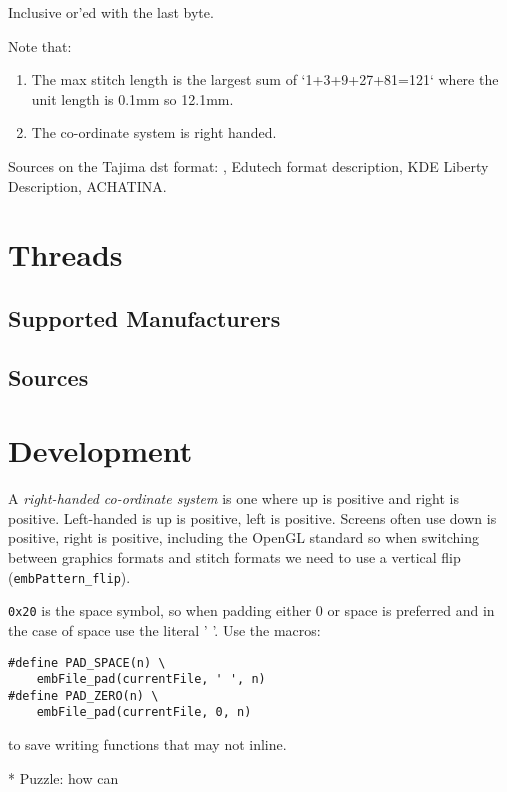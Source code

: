 \documentclass[onesize, a4paper]{refart}
\begin{document}
Inclusive or'ed with the last byte.

Note that:

\begin{enumerate}
\item The max stitch length is the largest sum of `1+3+9+27+81=121` where the unit length is 0.1mm so 12.1mm.
\item The co-ordinate system is right handed.
\end{enumerate}

Sources on the Tajima dst format: \cite{fineEmbStudio2021},
Edutech format description\cite{eduTechWikiDST},
KDE Liberty Description\cite{libertyTajima}, ACHATINA\cite{achatina}.

\section{Threads}

\subsection{Supported Manufacturers}

\subsection{Sources}

\section{Development}

A \emph{right-handed co-ordinate system} is one where up is positive and right is positive. Left-handed is up is positive, left is positive. Screens often use down is positive, right is positive, including the OpenGL standard so when switching between graphics formats and stitch formats we need to use a vertical flip (\texttt{embPattern\_flip}).

\texttt{0x20} is the space symbol, so when padding either 0 or space is preferred and in the case of space use the literal ' '. Use the macros:

\begin{verbatim}
#define PAD_SPACE(n) \
    embFile_pad(currentFile, ' ', n)
#define PAD_ZERO(n) \
    embFile_pad(currentFile, 0, n)
\end{verbatim}

to save writing functions that may not inline.

* Puzzle: how can 
\end{document}
